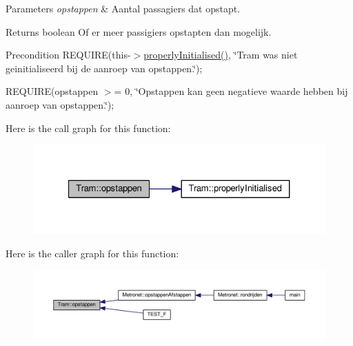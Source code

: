 \begin{DoxyParams}{Parameters}
{\em opstappen} & Aantal passagiers dat opstapt. \\
\hline
\end{DoxyParams}
\begin{DoxyReturn}{Returns}
boolean Of er meer passigiers opstapten dan mogelijk. 
\end{DoxyReturn}
\begin{DoxyPrecond}{Precondition}
R\+E\+Q\+U\+I\+RE(this-\/$>$\hyperlink{class_tram_a98992eff0453f54fbe64e1f1064169c7}{properly\+Initialised()}, \char`\"{}\+Tram was niet geinitialiseerd bij de aanroep van opstappen.\char`\"{}); 

R\+E\+Q\+U\+I\+RE(opstappen $>$= 0, \char`\"{}\+Opstappen kan geen negatieve waarde hebben bij aanroep van opstappen.\char`\"{}); 
\end{DoxyPrecond}


Here is the call graph for this function\+:\nopagebreak
\begin{figure}[H]
\begin{center}
\leavevmode
\includegraphics[width=327pt]{class_tram_aaeb00c535a6854f85dcc42cdff97ad0c_cgraph}
\end{center}
\end{figure}




Here is the caller graph for this function\+:\nopagebreak
\begin{figure}[H]
\begin{center}
\leavevmode
\includegraphics[width=350pt]{class_tram_aaeb00c535a6854f85dcc42cdff97ad0c_icgraph}
\end{center}
\end{figure}


